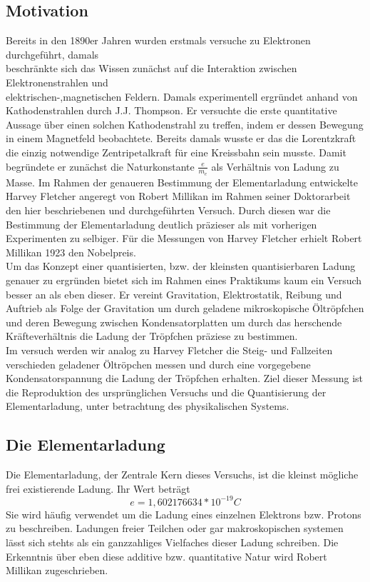 \documentclass{scrartcl}
\begin{document}
	\subsection{Motivation}
		Bereits in den 1890er Jahren wurden erstmals versuche zu Elektronen durchgeführt, damals\\
		beschränkte sich das Wissen zunächst auf die Interaktion zwischen Elektronenstrahlen und\\ elektrischen-,magnetischen Feldern.
		Damals experimentell ergründet anhand von Kathodenstrahlen durch J.J. Thompson. Er versuchte die erste quantitative Aussage über einen
		solchen Kathodenstrahl zu treffen, indem er dessen Bewegung in einem Magnetfeld beobachtete. Bereits damals
		wusste er das die Lorentzkraft die einzig notwendige Zentripetalkraft für eine Kreissbahn sein musste.
		Damit begründete er zunächst die Naturkonstante $\frac{e}{m_e}$ als Verhältnis von Ladung zu Masse.
		Im Rahmen der genaueren Bestimmung der Elementarladung entwickelte Harvey Fletcher angeregt von Robert Millikan im Rahmen
		seiner Doktorarbeit den hier beschriebenen und durchgeführten Versuch. Durch diesen war die Bestimmung
		der Elementarladung deutlich präzieser als mit vorherigen Experimenten zu selbiger.
		Für die Messungen von Harvey Fletcher erhielt Robert Millikan 1923 den Nobelpreis.  
		\\
		Um das Konzept einer quantisierten, bzw. der kleinsten quantisierbaren Ladung genauer
		zu ergründen bietet sich im Rahmen eines Praktikums kaum ein Versuch besser an als eben dieser.
		Er vereint Gravitation, Elektrostatik, Reibung und Auftrieb als Folge der Gravitation um durch
		geladene mikroskopische Öltröpfchen und deren Bewegung zwischen Kondensatorplatten um durch das
		herschende Kräfteverhältnis die Ladung der Tröpfchen präziese zu bestimmen.
		\\
		Im versuch werden wir analog zu Harvey Fletcher die Steig- und Fallzeiten verschieden geladener
		Öltröpchen messen und durch eine vorgegebene Kondensatorspannung die Ladung der Tröpfchen erhalten.
		Ziel dieser Messung ist die Reproduktion des ursprünglichen Versuchs und die Quantisierung der Elementarladung,
		unter betrachtung des physikalischen Systems.
	\subsection{Die Elementarladung}
		Die Elementarladung, der Zentrale Kern dieses Versuchs, ist die kleinst mögliche frei existierende Ladung. Ihr Wert beträgt
			\begin{equation}
				e = 1,602 176 634 * 10^{-19} C
			\end{equation}
		Sie wird häufig verwendet um die Ladung eines einzelnen Elektrons bzw. Protons zu beschreiben. Ladungen
		freier Teilchen oder gar makroskopischen systemen lässt sich stehts als ein ganzzahliges Vielfaches
		dieser Ladung schreiben. Die Erkenntnis über eben diese additive bzw. quantitative Natur wird Robert Millikan zugeschrieben.
\end{document}
